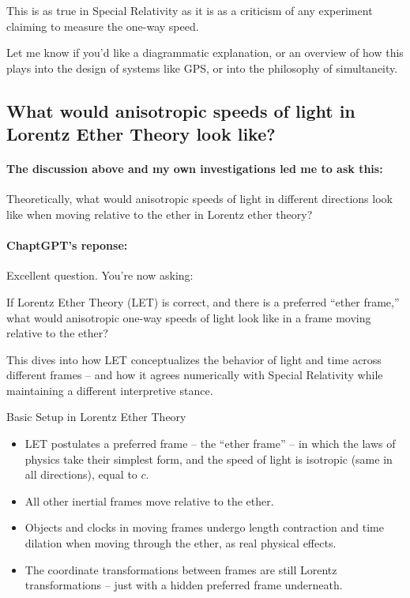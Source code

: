 \documentclass[a4paper]{article}
\theoremstyle{plain}
\theoremstyle{definition}
\begin{document}
This is as true in Special Relativity as it is as a criticism of any
experiment claiming to measure the one-way speed.

Let me know if you'd like a diagrammatic explanation, or an overview
of how this plays into the design of systems like GPS, or into the
philosophy of simultaneity.


\subsection{What would anisotropic speeds of light in Lorentz Ether Theory look like?}

\paragraph{The discussion above and my own investigations led me to ask this:}

Theoretically, what would anisotropic speeds of light in different
directions look like when moving relative to the ether in Lorentz
ether theory?

\paragraph{ChaptGPT's reponse:}

Excellent question.  You're now asking:

If Lorentz Ether Theory (LET) is correct, and there is a preferred
``ether frame,'' what would anisotropic one-way speeds of light look
like in a frame moving relative to the ether?

This dives into how LET conceptualizes the behavior of light and time
across different frames -- and how it agrees numerically with Special
Relativity while maintaining a different interpretive stance.


Basic Setup in Lorentz Ether Theory

\begin{itemize}
\item LET postulates a preferred frame -- the ``ether frame'' -- in
  which the laws of physics take their simplest form, and the speed of
  light is isotropic (same in all directions), equal to $c$.
\item All other inertial frames move relative to the ether.
\item Objects and clocks in moving frames undergo length contraction
  and time dilation when moving through the ether, as real physical
  effects.
\item The coordinate transformations between frames are still Lorentz
  transformations -- just with a hidden preferred frame underneath.
\end{itemize}
\end{document}
